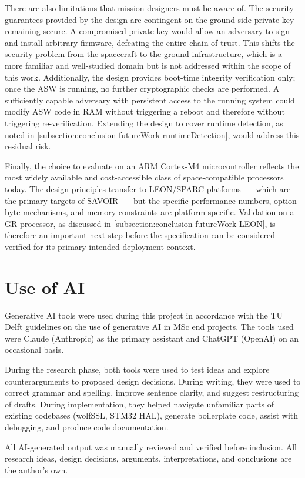 There are also limitations that mission designers must be aware of. The security guarantees provided by the design are contingent on the ground-side private key remaining secure. A compromised private key would allow an adversary to sign and install arbitrary firmware, defeating the entire chain of trust. This shifts the security problem from the spacecraft to the ground infrastructure, which is a more familiar and well-studied domain but is not addressed within the scope of this work. Additionally, the design provides boot-time integrity verification only; once the ASW is running, no further cryptographic checks are performed. A sufficiently capable adversary with persistent access to the running system could modify ASW code in RAM without triggering a reboot and therefore without triggering re-verification. Extending the design to cover runtime detection, as noted in \autoref{subsection:conclusion-futureWork-runtimeDetection}, would address this residual risk.

Finally, the choice to evaluate on an ARM Cortex-M4 microcontroller reflects the most widely available and cost-accessible class of space-compatible processors today. The design principles transfer to LEON/SPARC platforms~--- which are the primary targets of SAVOIR~--- but the specific performance numbers, option byte mechanisms, and memory constraints are platform-specific. Validation on a GR processor, as discussed in \autoref{subsection:conclusion-futureWork-LEON}, is therefore an important next step before the specification can be considered verified for its primary intended deployment context.

\section{Use of AI}

Generative AI tools were used during this project in accordance with the TU Delft guidelines on the use of generative AI in MSc end projects. The tools used were Claude (Anthropic) as the primary assistant and ChatGPT (OpenAI) on an occasional basis.

During the research phase, both tools were used to test ideas and explore counterarguments to proposed design decisions. During writing, they were used to correct grammar and spelling, improve sentence clarity, and suggest restructuring of drafts. During implementation, they helped navigate unfamiliar parts of existing codebases (wolfSSL, STM32 HAL), generate boilerplate code, assist with debugging, and produce code documentation.

All AI-generated output was manually reviewed and verified before inclusion. All research ideas, design decisions, arguments, interpretations, and conclusions are the author's own.